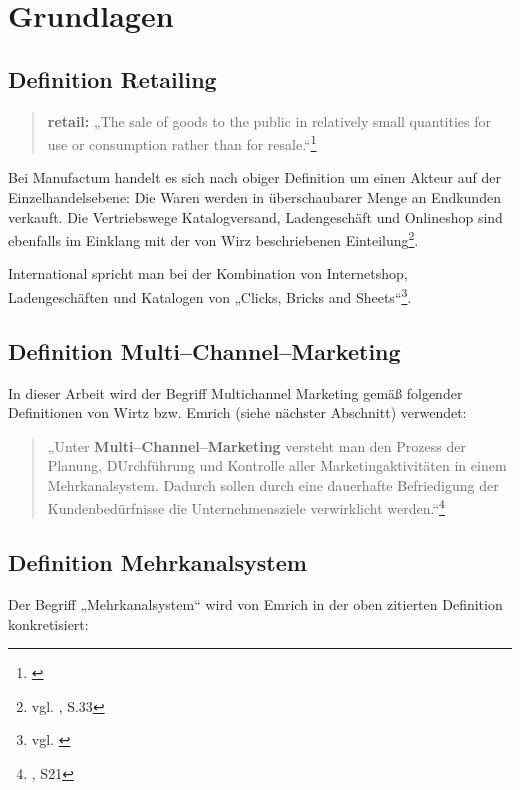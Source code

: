 \section{Grundlagen}
\label{sec:grundlagen}


\subsection{Definition Retailing}

\begin{quote}\textbf{retail:} „The sale of goods to the public in relatively small quantities for use or consumption rather than for resale.“\footnote{\cite{oxford:retail}}\end{quote}

Bei Manufactum handelt es sich nach obiger Definition um einen Akteur auf der Einzelhandelsebene: Die Waren werden in überschaubarer Menge an Endkunden verkauft. Die Vertriebswege Katalogversand, Ladengeschäft und Onlineshop sind ebenfalls im Einklang mit der von Wirz beschriebenen Einteilung\footnote{vgl. \cite{wirtz}, S.33}.

International spricht man bei der Kombination von Internetshop, Ladengeschäften und Katalogen von „Clicks, Bricks and Sheets“\footnote{vgl. \cite{klein}}.

\subsection{Definition Multi--Channel--Marketing}

In dieser Arbeit wird der Begriff Multichannel Marketing gemäß folgender Definitionen von Wirtz bzw. Emrich (siehe nächster Abschnitt) verwendet:

\begin{quote}„Unter \textbf{Multi--Channel--Marketing} versteht man den Prozess der Planung, DUrchführung und Kontrolle aller Marketingaktivitäten in einem Mehrkanalsystem. Dadurch sollen durch eine dauerhafte Befriedigung der Kundenbedürfnisse die Unternehmensziele verwirklicht werden.“\footnote{\cite{wirtz}, S21}\end{quote} 

\subsection{Definition Mehrkanalsystem}

Der Begriff „Mehrkanalsystem“ wird von Emrich in der oben zitierten Definition konkretisiert:

